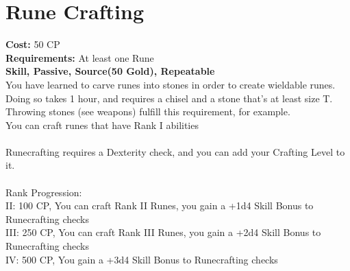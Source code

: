 \section{Rune Crafting}\label{perk:runecrafting}
\textbf{Cost:} 50 CP\\
\textbf{Requirements:} At least one Rune\\
\textbf{Skill, Passive, Source(50 Gold), Repeatable}\\
You have learned to carve runes into stones in order to create wieldable runes.\\
Doing so takes 1 hour, and requires a chisel and a stone that's at least size T.
Throwing stones (see weapons) fulfill this requirement, for example.\\
You can craft runes that have Rank I abilities\\
\\
Runecrafting requires a Dexterity check, and you can add your Crafting Level to it.\\
\\
Rank Progression:\\
II: 100 CP, You can craft Rank II Runes, you gain a +1d4 Skill Bonus to Runecrafting checks\\
III: 250 CP, You can craft Rank III Runes, you gain a +2d4 Skill Bonus to Runecrafting checks\\
IV: 500 CP, You gain a +3d4 Skill Bonus to Runecrafting checks\\